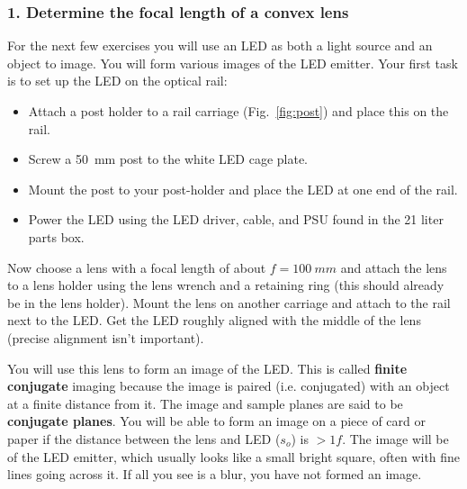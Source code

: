 \documentclass[a4paper]{report}
\begin{document}
\clearpage




\subsubsection{1. Determine the focal length of a convex lens }
For the next few exercises you will use an LED as both a light source and an object to image.
You will form various images of the LED emitter. 
Your first task is to set up the LED on the optical rail:

\begin{itemize}
\item Attach a post holder to a rail carriage (Fig.~\ref{fig:post}) and place this on the rail. 
\item Screw a 50~mm post to the white LED cage plate.
\item Mount the post to your post-holder and place the LED at one end of the rail.
\item Power the LED using the LED driver, cable, and PSU found in the 21 liter parts box.
\end{itemize}


Now choose a lens with a focal length of about $f=100~mm$ and attach the lens to a lens holder using the lens wrench and a retaining ring (this should already be in the lens holder).
Mount the lens on another carriage and attach to the rail next to the LED. 
Get the LED roughly aligned with the middle of the lens (precise alignment isn't important). 

You will use this lens to form an image of the LED.
This is called \textbf{finite conjugate} imaging because the image is paired (i.e. conjugated) with an object at a finite distance from it.
The image and sample planes are said to be \textbf{conjugate planes}.
You will be able to form an image on a piece of card or paper if the distance between the lens and LED ($s_o$) is $>1f$.
The image will be of the LED emitter, which  usually looks like a small bright square, often with fine lines going across it. 
If all you see is a blur, you have not formed an image.
\end{document}
